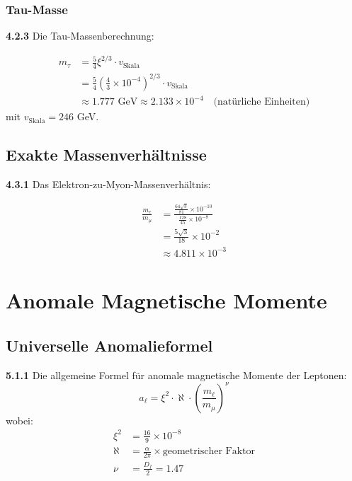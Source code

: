 \documentclass[12pt,a4paper]{article}
\newcommand{\xipar}{\xi}
\begin{document}
	\subsubsection{Tau-Masse}
	
	\noindent \textbf{4.2.3} Die Tau-Massenberechnung:
	\begin{keyresult}
		\begin{align}
			m_\tau &= \frac{5}{4} \xipar^{2/3} \cdot v_{\text{Skala}} \\
			&= \frac{5}{4} \left( \frac{4}{3} \times 10^{-4} \right)^{2/3} \cdot v_{\text{Skala}} \\
			&\approx 1.777 \text{ GeV} \approx 2.133 \times 10^{-4} \quad \text{(natürliche Einheiten)}
		\end{align}
		mit $v_{\text{Skala}} = 246$ GeV.
	\end{keyresult}
	
	\subsection{Exakte Massenverhältnisse}
	
	\noindent \textbf{4.3.1} Das Elektron-zu-Myon-Massenverhältnis:
	\begin{keyresult}
		\begin{align}
			\frac{m_e}{m_\mu} &= \frac{\frac{64 \sqrt{3}}{81} \times 10^{-10}}{\frac{128}{45} \times 10^{-8}} \\
			&= \frac{5 \sqrt{3}}{18} \times 10^{-2} \\
			&\approx 4.811 \times 10^{-3}
		\end{align}
	\end{keyresult}
\section{Anomale Magnetische Momente}

\subsection{Universelle Anomalieformel}

\noindent \textbf{5.1.1} Die allgemeine Formel für anomale magnetische Momente der Leptonen:
\begin{equation}
	a_\ell = \xipar^2 \cdot \aleph \cdot \left( \frac{m_\ell}{m_\mu} \right)^\nu
\end{equation}
wobei:
\begin{align}
	\xipar^2 &= \frac{16}{9} \times 10^{-8} \\
	\aleph &= \frac{\alpha}{2\pi} \times \text{geometrischer Faktor} \\
	\nu &= \frac{D_f}{2} = 1.47
\end{align}
\end{document}
